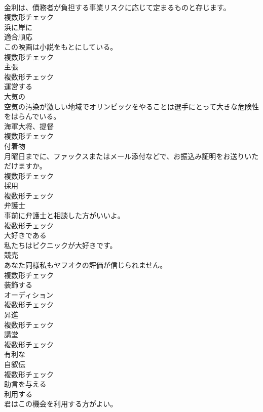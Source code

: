 \documentclass[8pt]{extreport}
\begin{document}
\begin{CJK}{UTF8}{min}
\\	金利は、債務者が負担する事業リスクに応じて定まるものと存じます。	
\\	複数形チェック
\\	[副詞]	浜に岸に	
\\	[名詞]	適合順応	
\\	この映画は小説をもとにしている。	
\\	複数形チェック
\\	[名詞]	主張	
\\	複数形チェック
\\	[動詞]	運営する	
\\	[形容詞]	大気の	
\\	空気の汚染が激しい地域でオリンピックをやることは選手にとって大きな危険性をはらんでいる。	
\\	[名詞]	海軍大将、提督	
\\	複数形チェック
\\	[名詞]	付着物	
\\	月曜日までに、ファックスまたはメール添付などで、お振込み証明をお送りいただけますか。	
\\	複数形チェック
\\	[名詞]	採用	
\\	複数形チェック
\\	[名詞]	弁護士	
\\	事前に弁護士と相談した方がいいよ。	
\\	複数形チェック
\\	[動詞]	大好きである	
\\	私たちはピクニックが大好きです。	
\\	[名詞]	競売	
\\	あなた同様私もヤフオクの評価が信じられません。	
\\	複数形チェック
\\	[動詞]	装飾する	
\\	[名詞]	オーディション	
\\	複数形チェック
\\	[名詞]	昇進	
\\	複数形チェック
\\	[名詞]	講堂	
\\	複数形チェック
\\	[形容詞]	有利な	
\\	[名詞]	自叙伝	
\\	複数形チェック
\\	[形容詞]	助言を与える	
\\	[動詞]	利用する	
\\	君はこの機会を利用する方がよい。	

\end{CJK}
\end{document}
